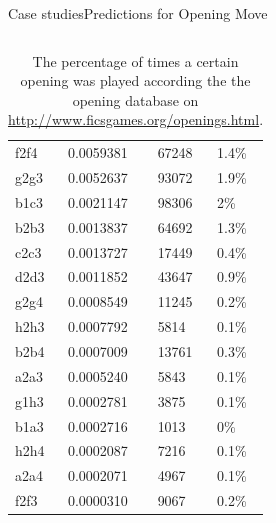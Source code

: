 \documentclass[9pt, unknownkeysallowed]{beamer}
\begin{document}
\begin{frame}{Case studies}{Predictions for Opening Move}
\begin{columns}[c]
\begin{column}{6cm}
\begin{table}[]
\begin{tabular}{@{}llll@{}}
f2f4 & 0.0059381             & 67248                  & 1.4\%              \\
g2g3 & 0.0052637             & 93072                  & 1.9\%              \\
b1c3 & 0.0021147             & 98306                  & 2\%                \\
b2b3 & 0.0013837             & 64692                  & 1.3\%              \\
c2c3 & 0.0013727             & 17449                  & 0.4\%              \\
d2d3 & 0.0011852             & 43647                  & 0.9\%              \\
g2g4 & 0.0008549             & 11245                  & 0.2\%              \\
h2h3 & 0.0007792             & 5814                   & 0.1\%              \\
b2b4 & 0.0007009             & 13761                  & 0.3\%              \\
a2a3 & 0.0005240             & 5843                   & 0.1\%              \\
g1h3 & 0.0002781             & 3875                   & 0.1\%              \\
b1a3 & 0.0002716             & 1013                   & 0\%                \\
h2h4 & 0.0002087             & 7216                   & 0.1\%              \\
a2a4 & 0.0002071             & 4967                   & 0.1\%              \\
f2f3 & 0.0000310             & 9067                   & 0.2\%              \\ 
\bottomrule
\end{tabular}
\caption{The percentage of times a certain opening 
was played according the the opening database on 
\url{http://www.ficsgames.org/openings.html}. }
\label{table:initialboard}
\end{table}
\end{column}
\end{columns}

\end{frame}
\end{document}
